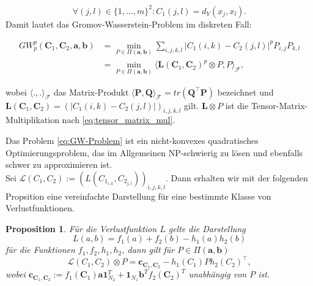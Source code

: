 \documentclass[twoside, 12pt,a4paper]{book}
\newtheorem{proposition}[theorem]{Proposition}
\numberwithin{equation}{section}
\begin{document}
	\begin{equation}
		\forall (j,l) \in \lbrace 1,...,m \rbrace^2 : C_1(j,l) = d_Y(x_j,x_l).
	\end{equation} Damit lautet das Gromov-Wasserstein-Problem im diskreten Fall:
	
	\begin{align}
	GW_p^p(\boldsymbol{C}_1, \boldsymbol{C}_2,\boldsymbol{a},\boldsymbol{b}) &= \min_{P \in \Pi(\boldsymbol{a}, \boldsymbol{b})}\sum_{i,j,k,l}{|C_1(i,k)- C_2(j,l)|^pP_{i,j}P_{k,l}}\\
	&=\min_{P \in \Pi(\boldsymbol{a}, \boldsymbol{b})} \langle \boldsymbol{L}(\boldsymbol{C}_1, \boldsymbol{C}_2)^p \otimes P, P\rangle_\mathcal{F},\label{eq:GW-Problem}
	\end{align}
	
	\noindent wobei $\langle .,.\rangle_\mathcal{F}$ das Matrix-Produkt $\langle \boldsymbol{P}, \boldsymbol{Q} \rangle_\mathcal{F}  = tr(\boldsymbol{Q}^\top\boldsymbol{P})$ bezeichnet und \\ $\boldsymbol{L}(\boldsymbol{C}_1, \boldsymbol{C}_2) = (|C_1(i,k)-C_2(j,l)|)_{i,j,k,l}$ gilt. $\boldsymbol{L} \otimes P$ ist die Tensor-Matrix-Multiplikation nach \eqref{eq:tensor_matrix_mul}.
	
	\noindent Das Problem \eqref{eq:GW-Problem} ist ein nicht-konvexes quadratisches Optimierungsproblem, das im Allgemeinen NP-schwierig zu lösen und ebenfalls schwer zu approximieren ist.\\
	
	\noindent Sei $\mathcal{L}(C_1,C_2) := (L(C_{1_{i,k}}, C_{2_{j,l}}))_{i,j,k,l}$. Dann erhalten wir mit der folgenden Propsition eine vereinfachte Darstellung für eine bestimmte Klasse von Verlustfunktionen.
	
	
	\begin{proposition}\cite{gwd_averaging_kernels}
		Für die Verlustfunktion $L$ gelte die Darstellung
		\begin{equation}
			L(a,b) = f_1(a) + f_2(b) - h_1(a)h_2(b) \label{eq:losscondition}
		\end{equation}
		\noindent für die Funktionen $f_1,f_2,h_1,h_2$, dann gilt für $P \in \Pi(\boldsymbol{a}, \boldsymbol{b})$
		\begin{equation}
			\mathcal{L}(C_1,C_2) \otimes P = \boldsymbol{c}_{\boldsymbol{C}_1,\boldsymbol{C}_2}-h_1(C_1)Ph_2(C_2)^\top, \label{prop:loss_reformulated}
		\end{equation}
		wobei $\boldsymbol{c}_{\boldsymbol{C}_1,  \boldsymbol{C}_2}:= f_1(\boldsymbol{C}_1)\boldsymbol{a} \boldsymbol{1}_{N_2}^T + \boldsymbol{1}_{N_1}\boldsymbol{b}^Tf_2(\boldsymbol{C}_2)^T$ unabhängig von $P$ ist.	
	\end{proposition}
	
\end{document}
